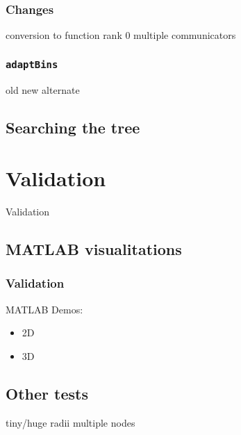 \documentclass{beamer}
\begin{document}
\subsubsection{Changes}
conversion to function
rank 0
multiple communicators

\subsubsection{\texttt{adaptBins}}
old
new
alternate



\subsection{Searching the tree}





\section{Validation}

\begin{frame}	
	\begin{Huge}
		\begin{center}
			Validation
		\end{center}
	\end{Huge}
\end{frame}

\subsection{MATLAB visualitations}

\begin{frame}	
	\frametitle{Validation}
	
	MATLAB Demos:
	
	\begin{itemize}
		\item 2D
		\item 3D
	\end{itemize}
	
\end{frame}


\subsection{Other tests}
tiny/huge radii
multiple nodes
\end{document}
